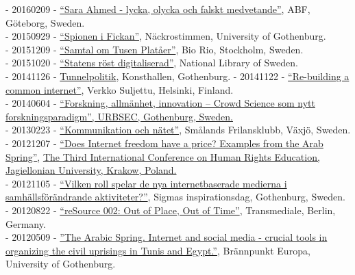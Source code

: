 \documentclass[a4paper,11pt,oneside]{article}
\begin{document}
{    - 20160209 - \href{http://www.abfgoteborg.org/index.php/archive/2016/170-filosofiscenen-2016/2208-sarah-ahmed-lycka-och-falskt-medvetande}{``Sara Ahmed - lycka, olycka och falskt medvetande''}, ABF, Göteborg, Sweden.\\
    - 20150929 - \href{http://hum.gu.se/aktuellt/Nyheter/fulltext//nackrostimmen--spionen-i-fickan-som-overvakar-oss.cid1324880}{``Spionen i Fickan''}, Näckrostimmen, University of Gothenburg.\\
    - 20151209 - \href{http://fhp.nu/tusenplataer}{``Samtal om Tusen Platåer''}, Bio Rio, Stockholm, Sweden.\\
    - 20151020 - \href{http://www.kb.se/aktuellt/evenemang/2015/SOUhack/}{``Statens röst digitaliserad''}, National Library of Sweden. \\
    - 20141126 - \href{http://www.wherevent.com/detail/Goteborgs-Konsthall-TUNNELPOLITIK-Forelasning-med-Christopher-Kullenberg}{Tunnelpolitik}, Konsthallen, Gothenburg.
    - 20141122 - \href{https://www.facebook.com/events/622473101197803/}{``Re-building a common internet''}, Verkko Suljettu, Helsinki, Finland. \\
    - 20140604 - \href{http://www.urbsec.se/digitalAssets/1483/1483366_program-urbsec-konferens-2014-06-04.pdf}{``Forskning, allmänhet, innovation – Crowd Science som nytt forskningsparadigm'', URBSEC, Gothenburg, Sweden.} \\
    - 20130223 - \href{http://www.frilansjournalisten.nu/2013/01/sasong-for-arsmoten/}{``Kommunikation och nätet''}, Smålands Frilansklubb, Växjö, Sweden. \\
    - 20121207 - \href{http://letstudio.gu.se/svenska/aktuellt/nyheter/n/christopher-kullenberg-inbjuden-som-talare-pa-internationell-konferens.cid1111971}{``Does Internet freedom have a price? Examples from the Arab Spring''}, \href{http://www.hre2012.uj.edu.pl/invited-speakers}{The Third International Conference on Human Rights Education, Jagiellonian University, Krakow, Poland.} \\
    - 20121105 - \href{https://www.youtube.com/watch?v=Zo24Qy_PU8I}{``Vilken roll spelar de nya internetbaserade medierna i samhällsförändrande aktiviteter?''}, Sigmas inspirationsdag, Gothenburg, Sweden. \\
    - 20120822 - \href{https://transmediale.de/content/resource-002-out-place-out-time}{``reSource 002: Out of Place, Out of Time''}, Transmediale, Berlin, Germany. \\
    - 20120509 - \href{http://pol.gu.se/aktuellt/kalendarium/aktuellt_detalj/?eventId=1777397828}{''The Arabic Spring. Internet and social media - crucial tools in organizing the civil uprisings in Tunis and Egypt.''}, Brännpunkt Europa, University of Gothenburg. \\
}
\end{document}
